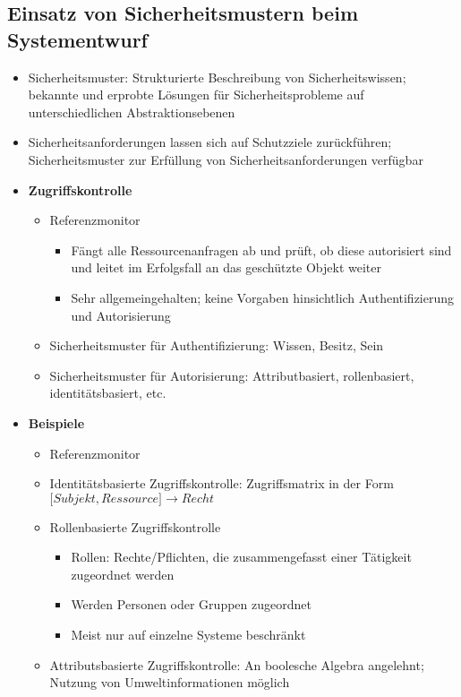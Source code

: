 \subsection{Einsatz von Sicherheitsmustern beim Systementwurf}
\begin{itemize}
	\item Sicherheitsmuster: Strukturierte Beschreibung von Sicherheitswissen; bekannte und erprobte Lösungen für Sicherheitsprobleme auf unterschiedlichen Abstraktionsebenen
	\item Sicherheitsanforderungen lassen sich auf Schutzziele zurückführen; Sicherheitsmuster zur Erfüllung von Sicherheitsanforderungen verfügbar
	\item \textbf{Zugriffskontrolle}
	\begin{itemize}
		\item Referenzmonitor
		\begin{itemize}
			\item Fängt alle Ressourcenanfragen ab und prüft, ob diese autorisiert sind und leitet im Erfolgsfall an das geschützte Objekt weiter
			\item Sehr allgemeingehalten; keine Vorgaben hinsichtlich Authentifizierung und Autorisierung
		\end{itemize}
		\item Sicherheitsmuster für Authentifizierung: Wissen, Besitz, Sein
		\item Sicherheitsmuster für Autorisierung: Attributbasiert, rollenbasiert, identitätsbasiert, etc.
	\end{itemize}
	\item \textbf{Beispiele}
	\begin{itemize}
		\item Referenzmonitor
		\item Identitätsbasierte Zugriffskontrolle: Zugriffsmatrix in der Form \(\lbrack Subjekt, Ressource \rbrack \longrightarrow Recht\)
		\item Rollenbasierte Zugriffskontrolle
		\begin{itemize}
			\item Rollen: Rechte/Pflichten, die zusammengefasst einer Tätigkeit zugeordnet werden
			\item Werden Personen oder Gruppen zugeordnet
			\item Meist nur auf einzelne Systeme beschränkt
		\end{itemize}
		\item Attributsbasierte Zugriffskontrolle: An boolesche Algebra angelehnt; Nutzung von Umweltinformationen möglich

\end{itemize}
\end{itemize}
